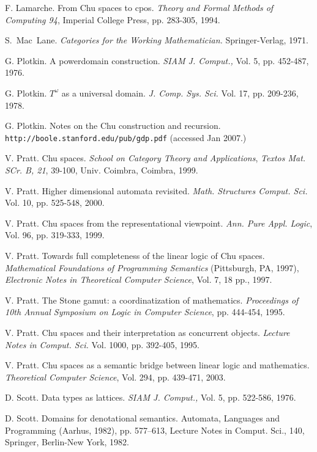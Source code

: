 \documentclass{LMCS}
\begin{document}
\begin{thebibliography}{10}
F. Lamarche. 
From Chu spaces to cpos. {\em Theory and Formal Methods of Computing 94}, Imperial College Press,
pp. 283-305, 1994. 



S.~Mac~Lane. 
\emph{Categories for the Working Mathematician.} 
Springer-Verlag, 1971. 


G. Plotkin. 
A powerdomain construction. {\em SIAM J. Comput.,} Vol. 5, pp. 452-487, 1976. 

G. Plotkin. 
$T^{\omega}$ as a universal domain. 
{\em J. Comp. Sys. Sci.} Vol. 17, pp. 209-236, 1978. 


G. Plotkin. Notes on the Chu construction and recursion. 
\verb+http://boole.stanford.edu/pub/gdp.pdf+ (accessed Jan 2007.) 

V. Pratt. 
Chu spaces. {\em School on Category Theory and Applications},  {\em Textos Mat. SCr. B, 21}, 39-100,  Univ. Coimbra, Coimbra, 1999. 


V.   Pratt. 
Higher dimensional automata revisited. {\em Math. Structures Comput. Sci.} 
Vol. 10, pp.  525-548, 2000. 


V. Pratt. 
Chu spaces from the representational viewpoint. {\em Ann. Pure Appl. Logic}, Vol. 96, pp.  319-333, 1999. 

V. Pratt. 
Towards full completeness of the linear logic of Chu spaces. 
{\em Mathematical {F}oundations of {P}rogramming {S}emantics} (Pittsburgh, PA, 1997),
{\em Electronic Notes in Theoretical Computer Science}, Vol. 7, 18 pp., 1997. 


V. Pratt. 
The Stone gamut: a coordinatization of mathematics. {\em Proceedings of 10th Annual Symposium on
Logic in Computer Science}, pp. 444-454, 1995. 

V. Pratt. 
Chu spaces and their interpretation as concurrent objects. {\em Lecture Notes in Comput. Sci.} Vol. 1000,
pp. 392-405, 1995. 

V. Pratt. 
Chu spaces as a semantic bridge between linear logic and mathematics. 
{\em Theoretical Computer Science},  Vol. 294, pp.  439-471, 2003. 

D. Scott. Data types as lattices. {\em SIAM J. Comput.,} Vol. 5, pp. 522-586, 1976. 

D. Scott. 
Domains for denotational semantics. Automata, {L}anguages and {P}rogramming (Aarhus, 1982),
pp. 577--613, Lecture Notes in Comput. Sci., 140, Springer, Berlin-New York, 1982. 



\end{thebibliography}
\end{document}
